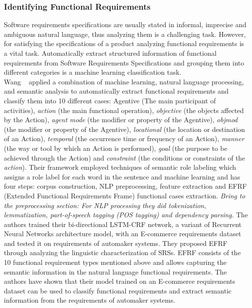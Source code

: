 \subsubsection{Identifying Functional Requirements}

Software requirements specifications are usually stated in informal, imprecise and ambiguous natural language, thus analyzing them is a challenging task. However, for satisfying the specifications of a product analyzing functional requirements is a vital task. Automatically extract structured information of functional requirements from Software Requirements Specifications and grouping them into different categories is a machine learning classification task\cite{7949577}. \\

Wang \etal~\cite{7949577} applied a combination of machine learning, natural
language processing, and semantic analysis to automatically extract functional
requirements and classify them into 10 different cases: Agentive (The main
participant of activities), \emph{action} (the main functional operation),
 \emph{objective} (the objects affected by the Action), \emph{agent mode} (the
 modifier or property of the Agentive), \emph{objmod} (the modifier or property
 of the Agentive), \emph{locational} (the location or
 destination of an Action), \emph{temporal} (the occurrence time or frequency of
 an Action), \emph{manner} (the way or tool by which an Action is performed),
 \emph{goal} (the purpose to be achieved through the Action) and
 \emph{constraint} (the conditions or constraints of the  \emph{action}). Their
 framework employed techniques of semantic role labeling which assigns a 
role  label  for  each  word  in  the  sentence and
 machine learning and has four steps: corpus construction, NLP
 preprocessing, feature extraction and EFRF (Extended Functional Requirements
 Frame) functional cases extraction.
 \emph{Bring to the preprocessing section: For NLP processing they did
 tokenization, lemmatization, part-of-speech tagging (POS tagging) and
 dependency parsing.} The authors trained their bi-directional LSTM-CRF network,
 a variant of Recurrent Neural Networks architecture model, with an E-commerce
 requirements dataset and tested it on requirements of automaker systems. They
 proposed EFRF through analyzing the linguistic characterization of
 SRSs. EFRF consists of the 10 functional requirement types mentioned
 above and allows capturing the semantic information in the natural language
 functional requirements. The authors have shown that their
 model trained on an E-commerce requirements dataset can be used to classify functional requirements and extract
 semantic information from the requirements of automaker systems.


